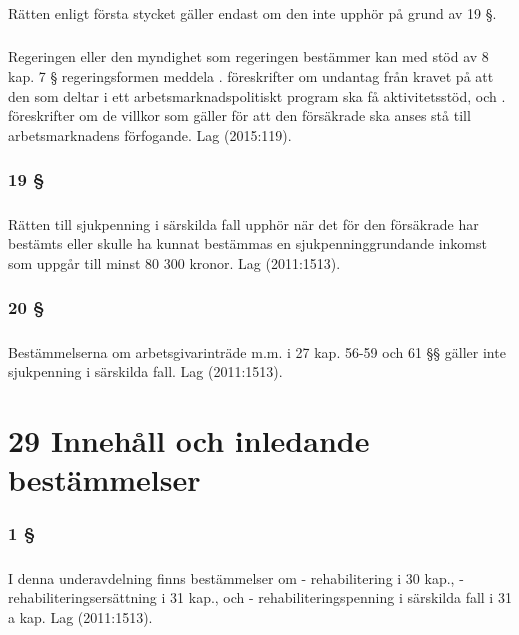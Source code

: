 \documentclass[a4paper,notitlepage,openany,10pt]{book}
\begin{document}
\paragraph*{}
Rätten enligt första stycket gäller endast om den inte upphör på grund av 19 §.
\paragraph*{}
Regeringen eller den myndighet som regeringen bestämmer kan med stöd av 8 kap. 7 § regeringsformen meddela
. föreskrifter om undantag från kravet på att den som deltar i ett arbetsmarknadspolitiskt program ska få aktivitetsstöd, och
. föreskrifter om de villkor som gäller för att den försäkrade ska anses stå till arbetsmarknadens förfogande.
Lag (2015:119).
\subsection*{19 §}
\paragraph*{}
Rätten till sjukpenning i särskilda fall upphör när det för den försäkrade har bestämts eller skulle ha kunnat bestämmas en sjukpenninggrundande inkomst som uppgår till minst 80 300 kronor.
Lag (2011:1513).
\subsection*{20 §}
\paragraph*{}
Bestämmelserna om arbetsgivarinträde m.m. i 27 kap. 56-59 och 61 §§ gäller inte sjukpenning i särskilda fall.
Lag (2011:1513).
\chapter*{29 Innehåll och inledande bestämmelser}
\subsection*{1 §}
\paragraph*{}
I denna underavdelning finns bestämmelser om
\newline - rehabilitering i 30 kap.,
\newline - rehabiliteringsersättning i 31 kap., och
\newline - rehabiliteringspenning i särskilda fall i 31 a kap.
Lag (2011:1513).
\end{document}
